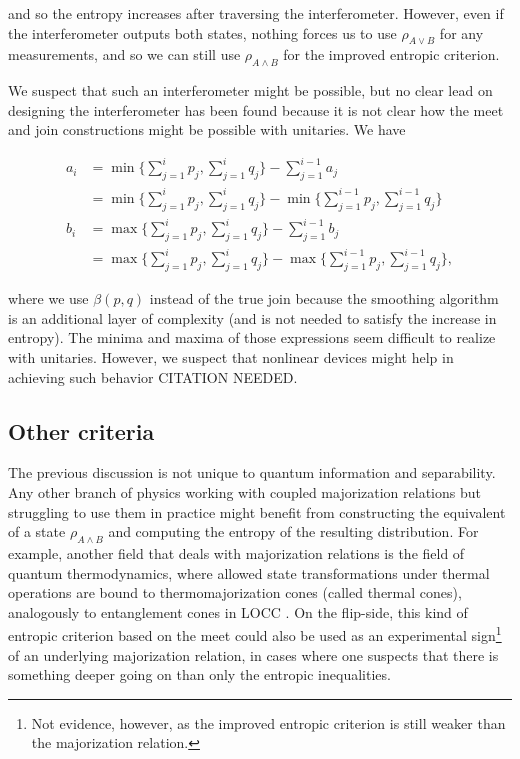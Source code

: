 \noindent and so the entropy increases after traversing the interferometer. However, even if the interferometer outputs both states, nothing forces us to use $\rho_{A \vee B}$ for any measurements, and so we can still use $\rho_{A \wedge B}$ for the improved entropic criterion.

We suspect that such an interferometer might be possible, but no clear lead on designing the interferometer has been found because it is not clear how the meet and join constructions might be possible with unitaries. We have

\begin{align}
    a_i &= \min \Big\{ \sum_{j=1}^{i} p_j , \sum_{j=1}^{i} q_j \Big\} - \sum_{j=1}^{i-1} a_j\\
    &= \min \Big\{ \sum_{j=1}^{i} p_j , \sum_{j=1}^{i} q_j \Big\} - \min \Big\{ \sum_{j=1}^{i-1} p_j , \sum_{j=1}^{i-1} q_j \Big\}\\
    b_i &= \max \Big\{ \sum_{j=1}^{i} p_j , \sum_{j=1}^{i} q_j \Big\} - \sum_{j=1}^{i-1} b_j\\
    &= \max \Big\{ \sum_{j=1}^{i} p_j , \sum_{j=1}^{i} q_j \Big\} - \max \Big\{ \sum_{j=1}^{i-1} p_j , \sum_{j=1}^{i-1} q_j \Big\},
\end{align}

\noindent where we use $\beta(p, q)$ instead of the true join because the smoothing algorithm is an additional layer of complexity (and is not needed to satisfy the increase in entropy). The minima and maxima of those expressions seem difficult to realize with unitaries. However, we suspect that nonlinear devices might help in achieving such behavior CITATION NEEDED.


\subsection{Other criteria}

The previous discussion is not unique to quantum information and separability. Any other branch of physics working with coupled majorization relations but struggling to use them in practice might benefit from constructing the equivalent of a state $\rho_{A \wedge B}$ and computing the entropy of the resulting distribution. For example, another field that deals with majorization relations is the field of quantum thermodynamics, where allowed state transformations under thermal operations are bound to thermomajorization cones (called thermal cones), analogously to entanglement cones in LOCC \cite{korzekwa_structure_2017, junior_geometric_2022}. On the flip-side, this kind of entropic criterion based on the meet could also be used as an experimental sign\footnote{Not evidence, however, as the improved entropic criterion is still weaker than the majorization relation.} of an underlying majorization relation, in cases where one suspects that there is something deeper going on than only the entropic inequalities.

